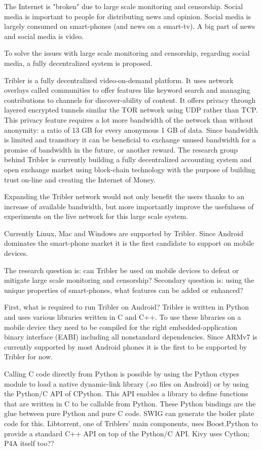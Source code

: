 The Internet is "broken" due to large scale monitoring and censorship.
Social media is important to people for distributing news and opinion.
Social media is largely consumed on smart-phones (and news on a smart-tv).
A big part of news and social media is video.

To solve the issues with large scale monitoring and censorship, regarding social media, a fully decentralized system is proposed.

Tribler is a fully decentralized video-on-demand platform.
It uses network overlays called communities to offer features like keyword search and managing contributions to channels for discover-ability of content.
It offers privacy through layered encrypted tunnels similar the TOR network using UDP rather than TCP.
This privacy feature requires a lot more bandwidth of the network than without anonymity: a ratio of 13 GB for every anonymous 1 GB of data.
Since bandwidth is limited and transitory it can be beneficial to exchange unused bandwidth for a promise of bandwidth in the future, or another reward.
The research group behind Tribler is currently building a fully decentralized accounting system and open exchange market using block-chain technology with the purpose of building trust on-line and creating the Internet of Money.

Expanding the Tribler network would not only benefit the users thanks to an increase of available bandwidth, but more importantly improve the usefulness of experiments on the live network for this large scale system.

Currently Linux, Mac and Windows are supported by Tribler. 
Since Android dominates the smart-phone market it is the first candidate to support on mobile devices.


The research question is: can Tribler be used on mobile devices to defeat or mitigate large scale monitoring and censorship?
Secondary question is: using the unique properties of smart-phones, what features can be added or enhanced?

First, what is required to run Tribler on Android?
Tribler is written in Python and uses various libraries written in C and C++.
To use these libraries on a mobile device they need to be compiled for the right embedded-application binary interface (EABI) including all nonstandard dependencies.
Since ARMv7 is currently supported by most Android phones it is the first to be supported by Tribler for now.


Calling C code directly from Python is possible by using the Python ctypes module to load a native dynamic-link library (.so files on Android) or by using the Python/C API of CPython.
This API enables a library to define functions that are written in C to be callable from Python.
These Python bindings are the glue between pure Python and pure C code.
SWIG can generate the boiler plate code for this.
Libtorrent, one of Triblers' main components, uses Boost.Python to provide a standard C++ API on top of the Python/C API.
Kivy uses Cython; P4A itself too??


